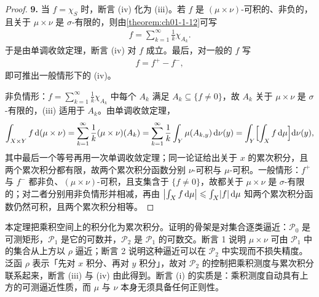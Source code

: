 \documentclass[../../main.tex]{subfiles}%
\begin{document}
\begin{proof}
\textbf{9.} 当 $f=\chi_S$ 时，断言 (iv) 化为 (iii)。若 $f$ 是 $(\mu\times\nu)$-可积的、非负的，且关于 $\mu\times\nu$ 是 $\sigma$-有限的，则由\cref{theorem:ch01-1-12}可写%
\begin{align*}
f=\sum_{k=1}^{\infty}\frac1k\chi_{A_k}.
\end{align*}
于是由单调收敛定理，断言 (iv) 对 $f$ 成立。最后，对一般的 $f$ 写
\begin{align*}
f=f^+-f^-,
\end{align*}
即可推出一般情形下的 (iv)。

非负情形：$f=\sum_{k=1}^{\infty}\frac1k\chi_{A_k}$ 中每个 $A_k$ 满足 $A_k\subseteq\{f\neq0\}$，故 $A_k$ 关于 $\mu\times\nu$ 是 $\sigma$-有限的，(iii) 适用于 $A_k$。由单调收敛定理，
\begin{align*}
\int_{X\times Y}f\,\mathrm{d}(\mu\times\nu)=\sum_{k=1}^{\infty}\frac1k(\mu\times\nu)(A_k)=\sum_{k=1}^{\infty}\frac1k\int_Y\mu(A_{k,y})\,\mathrm{d}\nu(y)=\int_Y\Bigl[\int_X f\,\mathrm{d}\mu\Bigr]\mathrm{d}\nu(y),
\end{align*}
其中最后一个等号再用一次单调收敛定理；同一论证给出关于 $x$ 的累次积分，且两个累次积分都有限，故两个累次积分函数分别 $\nu$-可积与 $\mu$-可积。一般情形：$f^+$ 与 $f^-$ 都非负、$(\mu\times\nu)$-可积，且支集含于 $\{f\neq0\}$，故都关于 $\mu\times\nu$ 是 $\sigma$-有限的；对二者分别用非负情形并相减，再由 $\bigl\lvert\int_X f\,\mathrm{d}\mu\bigr\rvert\leqslant\int_X\lvert f\rvert\,\mathrm{d}\mu$ 知两个累次积分函数仍然可积，且两个累次积分相等。
\end{proof}

\begin{remark}\label{remark:ch01-thm-1-22-动机}
本定理把乘积空间上的积分化为累次积分。证明的骨架是对集合逐类逼近：$\mathcal{P}_0$ 是可测矩形，$\mathcal{P}_1$ 是它的可数并，$\mathcal{P}_2$ 是 $\mathcal{P}_1$ 的可数交。断言 1 说明 $\mu\times\nu$ 可由 $\mathcal{P}_1$ 中的集合从上方以 $\rho$ 逼近；断言 2 说明这种逼近可以在 $\mathcal{P}_2$ 中实现而不损失精度。泛函 $\rho$ 表示「先对 $x$ 积分、再对 $y$ 积分」，故对 $\mathcal{P}_2$ 的控制把乘积测度与累次积分联系起来，断言 (iii) 与 (iv) 由此得到。断言 (i) 的实质是：乘积测度自动具有上方的可测逼近性质，而 $\mu$ 与 $\nu$ 本身无须具备任何正则性。
\end{remark}
\end{document}
